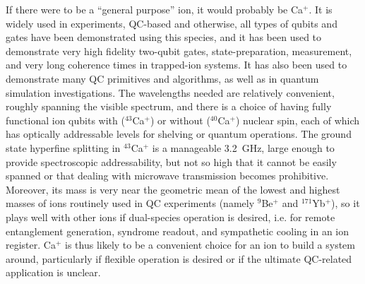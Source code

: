 \documentclass[%
reprint,
 amsmath,amssymb,
]{revtex4-1}
\begin{document}
If there were to be a ``general purpose'' ion, it would probably be Ca$^{+}$.  It is widely used in experiments, QC-based and otherwise, all types of qubits and gates have been demonstrated using this species, and it has been used to demonstrate very high fidelity two-qubit gates, state-preparation, measurement, and very long coherence times in trapped-ion systems.  It has also been used to demonstrate many QC primitives and algorithms, as well as in quantum simulation investigations.  The wavelengths needed are relatively convenient, roughly spanning the visible spectrum, and there is a choice of having fully functional ion qubits with ($^{43}$Ca$^{+}$) or without ($^{40}$Ca$^{+}$) nuclear spin, each of which has optically addressable levels for shelving or quantum operations.  The ground state hyperfine splitting in $^{43}$Ca$^{+}$ is a manageable 3.2~GHz, large enough to provide spectroscopic addressability, but not so high that it cannot be easily spanned or that dealing with microwave transmission becomes prohibitive.  Moreover, its mass is very near the geometric mean of the lowest and highest masses of ions routinely used in QC experiments (namely $^{9}$Be$^{+}$ and $^{171}$Yb$^{+}$), so it plays well with other ions if dual-species operation is desired, i.e. for remote entanglement generation, syndrome readout, and sympathetic cooling in an ion register. Ca$^{+}$ is thus likely to be a convenient choice for an ion to build a system around, particularly if flexible operation is desired or if the ultimate QC-related application is unclear.
\end{document}
